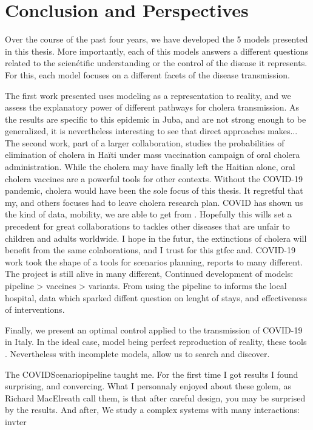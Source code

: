 \chapter{Conclusion and Perspectives}
Over the course of the past four years, we have developed the 5 models presented in this thesis. More importantly, each of this models answers a different questions related to the  scienétific understanding or the control of the disease it represents. For this, each model focuses on a different facets of the disease transmission. 

The first work presented uses modeling as a representation to reality, and we assess the explanatory power of different pathways for cholera transmission. As the results are  specific to this epidemic in Juba, and are not strong enough to be generalized, it is nevertheless interesting to see that direct approaches makes... The second work, part of a larger collaboration, studies the probabilities of elimination of cholera in Haïti under mass vaccination campaign of oral cholera administration. While the cholera may have finally left the Haitian alone, oral cholera vaccines are a powerful tools for other contexts.
Without the COVID-19 pandemic, cholera would have been the sole focus of this thesis. It regretful that my, and others focuses had to leave cholera research plan.
 COVID has shown us the kind of data, mobility, we are able to get from . Hopefully this wills set a precedent for great collaborations to tackles other diseases that are unfair to children and adults worldwide.  I hope in the futur, the extinctions of cholera will benefit from the same colaborations, and I trust for this gtfcc and.
 COVID-19 work took the shape of a tools for scenarios planning, reports to many different. The project is still alive in many different, Continued development of models: pipeline > vaccines > variants.
From using the pipeline to informs the local hospital, data which sparked diffent question on lenght of stays, and effectiveness of interventions.

Finally, we present an optimal control applied to the transmission of COVID-19 in Italy. In the ideal case, model being perfect reproduction of reality, these tools . Nevertheless with incomplete models, allow us to search and discover. 

The COVIDScenariopipeline taught me. For the first time I got results I found surprising, and convercing.  What I personnaly enjoyed about these golem, as Richard MacElreath call them, is that after careful design, you may be surprised by the results. And after,
We study a complex systems with many interactions: invter



